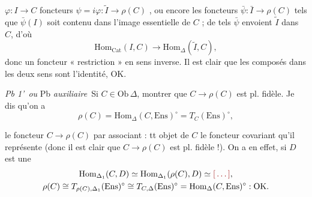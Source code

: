 \documentclass[11pt,a4paper]{article}
\begin{document}
\begin{enumerate}
    $\varphi : I \to C$   foncteurs $\psi = i\varphi :
    \tilde{I} \to \rho(C)$ , ou encore les foncteurs
    $\bar{\psi} : \bar{I} \to \rho(C)$ tels que $\bar{\psi}(I)$ soit
    contenu dans l'image essentielle de $C$ ; de tels $\bar{\psi}$
    envoient $\tilde{I}$ dans $C$, d'où
    \[
      \mathrm{Hom}_{\mathrm{Cat}}(I, C) \longrightarrow
      \mathrm{Hom}_{\Delta}(\tilde{I}, C),
    \]
    donc un foncteur « restriction » en sens inverse. Il est clair que
    les composés dans les deux sens sont l'identité, OK.

    \emph{Pb 1'}\ \emph{ou} Pb \emph{auxiliaire}\ Si $C
    \in \mathrm{Ob}\,\Delta$, montrer que $C \to \rho(C)$ est pl.
    fidèle. Je dis qu'on a
    \[
      \rho(C) = \mathrm{Hom}_{\Delta}(C, \mathrm{Ens})^{\circ} =
      T_{C}(\mathrm{Ens})^{\circ},
    \]
\end{enumerate}

le foncteur $C \to \rho(C)$    par
 associant : tt objet de $C$ le foncteur covariant qu'il
représente (donc il est clair que $C \to \rho(C)$ est pl. fidèle !). On
a en effet, si $D$ est une  
\begin{gather*}
  \mathrm{Hom}_{\Delta_{1}}(C, D) \simeq \mathrm{Hom}_{\Delta_{1}}
  (\rho(C), D) \simeq \ill{}, \\
  \rho(C) \cong T_{\rho(C), \Delta_{1}}(\mathrm{Ens})^{\circ} \cong
  T_{C, \Delta}(\mathrm{Ens})^{\circ} = \mathrm{Hom}_{\Delta}(C,
  \mathrm{Ens})^{\circ} : \text{OK.}
\end{gather*}
\end{document}
